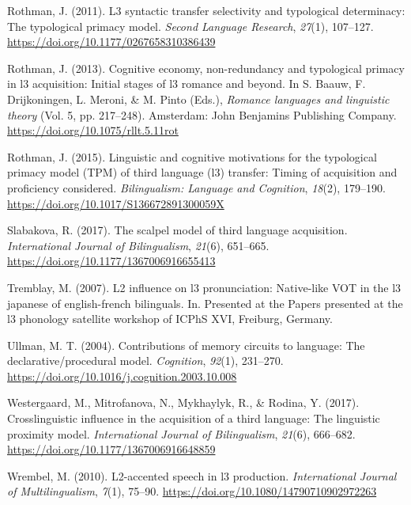 \documentclass[
  english,
  man]{apa6}
\begin{document}
\leavevmode\hypertarget{ref-rothman_l3_2011}{}%
Rothman, J. (2011). L3 syntactic transfer selectivity and typological determinacy: The typological primacy model. \emph{Second Language Research}, \emph{27}(1), 107--127. \url{https://doi.org/10.1177/0267658310386439}

\leavevmode\hypertarget{ref-baauw_cognitive_2013}{}%
Rothman, J. (2013). Cognitive economy, non-redundancy and typological primacy in l3 acquisition: Initial stages of l3 romance and beyond. In S. Baauw, F. Drijkoningen, L. Meroni, \& M. Pinto (Eds.), \emph{Romance languages and linguistic theory} (Vol. 5, pp. 217--248). Amsterdam: John Benjamins Publishing Company. \url{https://doi.org/10.1075/rllt.5.11rot}

\leavevmode\hypertarget{ref-rothman_linguistic_2015}{}%
Rothman, J. (2015). Linguistic and cognitive motivations for the typological primacy model (TPM) of third language (l3) transfer: Timing of acquisition and proficiency considered. \emph{Bilingualism: Language and Cognition}, \emph{18}(2), 179--190. \url{https://doi.org/10.1017/S136672891300059X}

\leavevmode\hypertarget{ref-slabakova_scalpel_2017}{}%
Slabakova, R. (2017). The scalpel model of third language acquisition. \emph{International Journal of Bilingualism}, \emph{21}(6), 651--665. \url{https://doi.org/10.1177/1367006916655413}

\leavevmode\hypertarget{ref-tremblay_l2_2007}{}%
Tremblay, M. (2007). L2 influence on l3 pronunciation: Native-like VOT in the l3 japanese of english-french bilinguals. In. Presented at the Papers presented at the l3 phonology satellite workshop of ICPhS XVI, Freiburg, Germany.

\leavevmode\hypertarget{ref-ullman_contributions_2004}{}%
Ullman, M. T. (2004). Contributions of memory circuits to language: The declarative/procedural model. \emph{Cognition}, \emph{92}(1), 231--270. \url{https://doi.org/10.1016/j.cognition.2003.10.008}

\leavevmode\hypertarget{ref-westergaard_crosslinguistic_2017}{}%
Westergaard, M., Mitrofanova, N., Mykhaylyk, R., \& Rodina, Y. (2017). Crosslinguistic influence in the acquisition of a third language: The linguistic proximity model. \emph{International Journal of Bilingualism}, \emph{21}(6), 666--682. \url{https://doi.org/10.1177/1367006916648859}

\leavevmode\hypertarget{ref-wrembel_l2-accented_2010}{}%
Wrembel, M. (2010). L2-accented speech in l3 production. \emph{International Journal of Multilingualism}, \emph{7}(1), 75--90. \url{https://doi.org/10.1080/14790710902972263}
\end{document}

